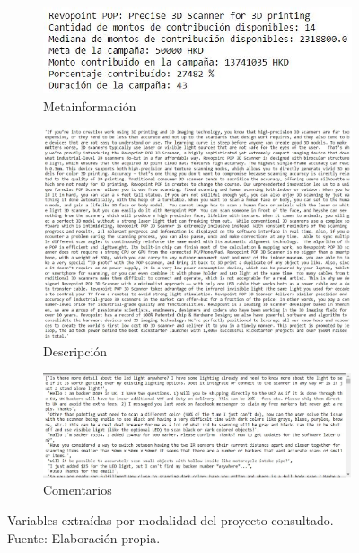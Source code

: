 \begin{figure}[!ht]
	\centering
	\small
	\begin{subfigure}{1.0\textwidth}
		\centering
		\includegraphics[width=0.75\linewidth]{4/figures/metadata_scraped_project.jpg}
		\caption{Metainformación}
	\end{subfigure}
	\begin{subfigure}{.50\textwidth}
		\centering
		\includegraphics[width=0.95\linewidth]{4/figures/description_scraped_project.jpg}
		\caption{Descripción}
	\end{subfigure}%
	\begin{subfigure}{.50\textwidth}
		\centering
		\includegraphics[width=0.95\linewidth]{4/figures/comments_scraped_project.jpg}
		\caption{Comentarios}
	\end{subfigure}
	\caption[Variables extraídas por modalidad del proyecto consultado]{Variables extraídas por modalidad del proyecto consultado.\\
		Fuente: Elaboración propia.}
	\vspace{-0.3cm}
	\label{4:fig40}
\end{figure}

